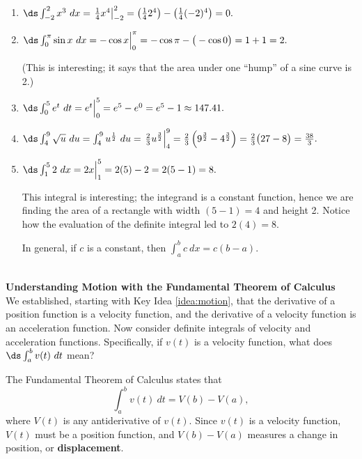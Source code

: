 {\begin{enumerate}
\item	$\ds \int_{-2}^2 x^3\ dx = \left.\frac14x^4\right|_{-2}^2 = \left(\frac142^4\right) - \left(\frac14(-2)^4\right) = 0.$
\item		$\ds \int_0^\pi \sin x\ dx = -\cos x\Big|_0^\pi = -\cos \pi- \big(-\cos 0\big) = 1+1=2.$ 

(This is interesting; it says that the area under one ``hump'' of a sine curve is 2.)
\item	 $\ds \int_0^5e^t\ dt = e^t\Big|_0^5 = e^5 - e^0 = e^5-1 \approx 147.41.$
\item		$\ds \int_4^9 \sqrt{u}\ du = \int_4^9 u^\frac12\ du = \left.\frac23u^\frac32\right|_4^9 = \frac23\left(9^\frac32-4^\frac32\right) = \frac23\big(27-8\big) =\frac{38}3.$
\item		$\ds \int_1^5 2\ dx = 2x\Big|_1^5 = 2(5)-2=2(5-1)=8.$ 

This integral is interesting; the integrand is a constant function, hence we are finding the area of a rectangle with width $(5-1)=4$ and height 2. Notice how the evaluation of the definite integral led to $2(4)=8$. 

In general, if $c$ is a constant, then $\int_a^b c\ dx = c(b-a)$.
\end{enumerate}
\vskip -15pt
}\\

\noindent\textbf{\large Understanding Motion with the Fundamental Theorem of Calculus}\\

We established, starting with Key Idea \ref{idea:motion}, that the derivative of a position function is a velocity function, and the derivative of a velocity function is an acceleration function. Now consider definite integrals of velocity and acceleration functions. Specifically, if $v(t)$ is a velocity function, what does $\ds \int_a^b v(t)\ dt$ mean?

The Fundamental Theorem of Calculus states that
$$\int_a^b v(t)\ dt = V(b) - V(a),$$ where $V(t)$ is any antiderivative of $v(t)$. Since $v(t)$ is a velocity function, $V(t)$ must be a position function, and $V(b) - V(a)$ measures a change in position, or \textbf{displacement}.\\

